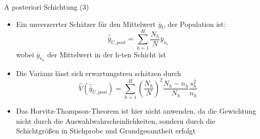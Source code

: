 \documentclass[9pt]{beamer}
\begin{document}
\begin{frame}{A posteriori Schichtung (3)}
\begin{itemize}

	\item Ein unverzerrter Schätzer für den Mittelwert $\bar{y}_{U}$ der Population ist:
$$\hat{\bar{y}}_{U,post} = \sum_{h=1}^H \frac{N_h}{N}\bar{y}_{s_h}$$
wobei $\bar{y}_{s_h}$ der Mittelwert in der h-ten Schicht ist
\item Die Varianz lässt sich erwartungstreu schätzen durch
$$\hat{V}(\hat{\bar{y}}_{U,post}) = \sum_{h=1}^H \left(\frac{N_h}{N}\right)^2 \frac{N_h - n_h}{N_h} \frac{s_h^2}{n_h}$$
    \item Das Horvitz-Thompson-Theorem ist hier
nicht anwenden, da die Gewichtung nicht durch die Auswahlwahrscheinlichkeiten,
sondern durch die Schichtgrößen in Stichprobe und Grundgesamtheit erfolgt
\end{itemize}
\end{frame}
\end{document}
